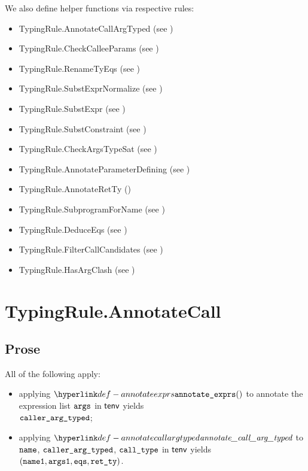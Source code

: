We also define helper functions via respective rules:
\begin{itemize}
  \item TypingRule.AnnotateCallArgTyped (see )
  \item TypingRule.CheckCalleeParams (see )
  \item TypingRule.RenameTyEqs (see )
  \item TypingRule.SubstExprNormalize (see )
  \item TypingRule.SubstExpr (see )
  \item TypingRule.SubstConstraint (see )
  \item TypingRule.CheckArgsTypeSat (see )
  \item TypingRule.AnnotateParameterDefining (see )
  \item TypingRule.AnnotateRetTy ()
  \item TypingRule.SubprogramForName (see )
  \item TypingRule.DeduceEqs (see )
  \item TypingRule.FilterCallCandidates (see )
  \item TypingRule.HasArgClash (see )
\end{itemize}

\section{TypingRule.AnnotateCall \label{sec:TypingRule.AnnotateCall}}
\subsection{Prose}
All of the following apply:
\begin{itemize}
  \item applying $\annotateexprlist$ to annotate the expression list $\texttt{args}$ in $\textsf{tenv}$ yields \\
        $\texttt{caller\_arg\_typed}$\ProseOrTypeError;
  \item applying $\annotatecallargtyped$ to $\texttt{name}$, $\texttt{caller\_arg\_typed}$, $\texttt{call\_type}$ in $\textsf{tenv}$ yields
        $(\texttt{name1}, \texttt{args1}, \texttt{eqs}, \texttt{ret\_ty})$\ProseOrTypeError.
\end{itemize}

